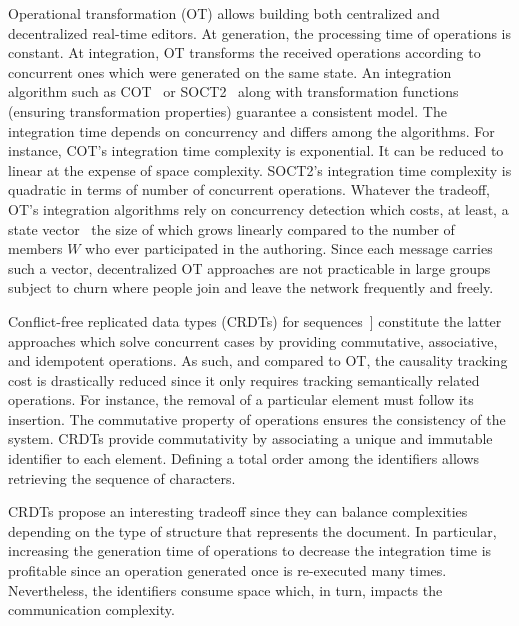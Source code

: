 Operational transformation (OT) allows building both centralized and
decentralized real-time editors. At generation, the processing time of
operations is constant. At integration, OT transforms the received operations
according to concurrent ones which were generated on the same state. An
integration algorithm such as COT~\cite{sun2009contextbased} or
SOCT2~\cite{vidot2000copies} along with transformation functions (ensuring
transformation properties) guarantee a consistent model. The integration time
depends on concurrency and differs among the algorithms.  For instance, COT's
integration time complexity is exponential. It can be reduced to linear at the
expense of space complexity. SOCT2's integration time complexity is quadratic in
terms of number of concurrent operations.  Whatever the tradeoff, OT's
integration algorithms rely on concurrency detection which costs, at least, a
state vector~\cite{charronbost1991concerning} the size of which grows linearly
compared to the number of members $W$ who ever participated in the
authoring. Since each message carries such a vector, decentralized OT approaches
are not practicable in large groups subject to churn where people join and leave
the network frequently and freely. %

Conflict-free replicated data types (CRDTs) for
sequences~\cite{shapiro2011comprehensive, shapiro2011conflict}] constitute the
latter approaches which solve concurrent cases by providing commutative,
associative, and idempotent operations. As such, and compared to OT, the
causality tracking cost is drastically reduced since it only requires tracking
semantically related operations. For instance, the removal of a particular
element must follow its insertion. The commutative property of operations
ensures the consistency of the system. CRDTs provide commutativity by
associating a unique and immutable identifier to each element. Defining a total
order among the identifiers allows retrieving the sequence of characters.

\noindent CRDTs propose an interesting tradeoff since they can balance complexities
depending on the type of structure that represents the document.  In particular,
increasing the generation time of operations to decrease the integration time is
profitable since an operation generated once is re-executed many
times. Nevertheless, the identifiers consume space which, in turn, impacts the
communication complexity.

